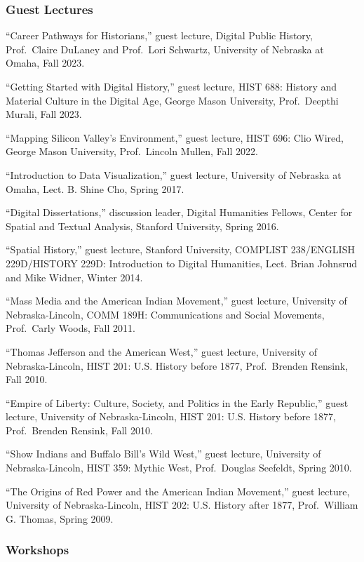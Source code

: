 \subsubsection{Guest Lectures}\label{guest-lectures}

``Career Pathways for Historians,'' guest lecture, Digital Public
History, Prof.~Claire DuLaney and Prof.~Lori Schwartz, University of
Nebraska at Omaha, Fall 2023.

``Getting Started with Digital History,'' guest lecture, HIST 688:
History and Material Culture in the Digital Age, George Mason
University, Prof.~Deepthi Murali, Fall 2023.

``Mapping Silicon Valley's Environment,'' guest lecture, HIST 696: Clio
Wired, George Mason University, Prof.~Lincoln Mullen, Fall 2022.

``Introduction to Data Visualization,'' guest lecture, University of
Nebraska at Omaha, Lect. B. Shine Cho, Spring 2017.

``Digital Dissertations,'' discussion leader, Digital Humanities
Fellows, Center for Spatial and Textual Analysis, Stanford University,
Spring 2016.

``Spatial History,'' guest lecture, Stanford University, COMPLIST
238/ENGLISH 229D/HISTORY 229D: Introduction to Digital Humanities, Lect.
Brian Johnsrud and Mike Widner, Winter 2014.

``Mass Media and the American Indian Movement,'' guest lecture,
University of Nebraska-Lincoln, COMM 189H: Communications and Social
Movements, Prof.~Carly Woods, Fall 2011.

``Thomas Jefferson and the American West,'' guest lecture, University of
Nebraska-Lincoln, HIST 201: U.S. History before 1877, Prof.~Brenden
Rensink, Fall 2010.

``Empire of Liberty: Culture, Society, and Politics in the Early
Republic,'' guest lecture, University of Nebraska-Lincoln, HIST 201:
U.S. History before 1877, Prof.~Brenden Rensink, Fall 2010.

``Show Indians and Buffalo Bill's Wild West,'' guest lecture, University
of Nebraska-Lincoln, HIST 359: Mythic West, Prof.~Douglas Seefeldt,
Spring 2010.

``The Origins of Red Power and the American Indian Movement,'' guest
lecture, University of Nebraska-Lincoln, HIST 202: U.S. History after
1877, Prof.~William G. Thomas, Spring 2009.

\subsubsection{Workshops}\label{workshops}

